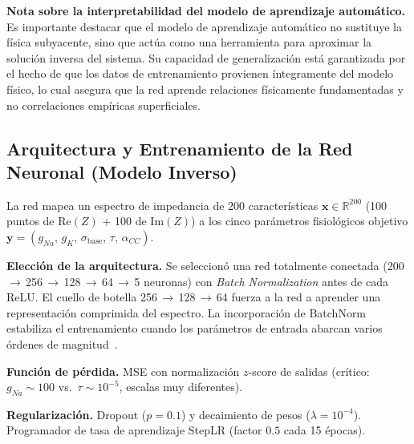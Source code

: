 \documentclass[12pt]{article}
\begin{document}
\noindent\textbf{Nota sobre la interpretabilidad del modelo de aprendizaje autom\'atico.}
Es importante destacar que el modelo de aprendizaje autom\'atico no sustituye la f\'isica
subyacente, sino que act\'ua como una herramienta para aproximar la soluci\'on inversa del
sistema. Su capacidad de generalizaci\'on est\'a garantizada por el hecho de que los datos
de entrenamiento provienen \'integramente del modelo f\'isico, lo cual asegura que la red
aprende relaciones f\'isicamente fundamentadas y no correlaciones emp\'iricas superficiales.

\subsection{Arquitectura y Entrenamiento de la Red Neuronal (Modelo Inverso)}
La red mapea un espectro de impedancia de 200 caracter\'isticas
$\mathbf{x} \in \mathbb{R}^{200}$ (100 puntos de $\text{Re}(Z)$ + 100 de $\text{Im}(Z)$)
a los cinco par\'ametros fisiol\'ogicos objetivo
$\mathbf{y} = (g_{Na},\,g_K,\,\sigma_{\text{base}},\,\tau,\,\alpha_{CC})$.

\textbf{Elecci\'on de la arquitectura.} Se seleccion\'o una red totalmente conectada
(200\,$\to$\,256\,$\to$\,128\,$\to$\,64\,$\to$\,5 neuronas)
con \emph{Batch Normalization} antes de cada ReLU.
El cuello de botella 256\,$\to$\,128\,$\to$\,64 fuerza a la red
a aprender una representaci\'on comprimida del espectro.
La incorporaci\'on de BatchNorm estabiliza el entrenamiento cuando los
par\'ametros de entrada abarcan varios \'ordenes de magnitud~\citep{Barsoukov2005}.

\textbf{Funci\'on de p\'erdida.} MSE con normalizaci\'on $z$-score de salidas
(cr\'itico: $g_{Na}\sim 100$ vs.\ $\tau\sim 10^{-5}$, escalas muy diferentes).

\textbf{Regularizaci\'on.} Dropout ($p = 0.1$) y decaimiento de pesos ($\lambda = 10^{-4}$).
Programador de tasa de aprendizaje StepLR (factor $0.5$ cada 15 \'epocas).
\end{document}
